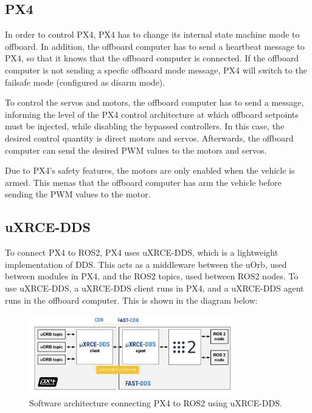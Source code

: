 \documentclass[a4paper]{article}
\begin{document}
\subsection{PX4}

In order to control PX4, PX4 has to change its internal state machine mode to offboard.
In addition, the offboard computer has to send a heartbeat message to PX4, so that it knows that the offboard computer is connected.
If the offboard computer is not sending a specfic offboard mode message, PX4 will switch to the failsafe mode (configured as disarm mode).

To control the servos and motors, the offboard computer has to send a message, informing the level of the PX4 control architecture at which offboard setpoints must be injected, while disabling the bypassed controllers. 
In this case, the desired control quantity is direct motors and servos. 
Afterwards, the offboard computer can send the desired PWM values to the motors and servos.

Due to PX4's safety features, the motors are only enabled when the vehicle is armed. 
This menas that the offboard computer has arm the vehicle before sending the PWM values to the motor. 

\subsection{uXRCE-DDS}

To connect PX4 to ROS2, PX4 uses uXRCE-DDS, which is a lightweight implementation of DDS. 
This acts as a middleware between the uOrb, used between modules in PX4, and the ROS2 topics, used between ROS2 nodes. 
To use uXRCE-DDS, a uXRCE-DDS client runs in PX4, and a uXRCE-DDS agent runs in the offboard computer. 
This is shown in the diagram below: 

\begin{figure}[H]
    \centering
    \includegraphics[width=0.8\textwidth]{imgs/architecture_xrce_dds_ros2.png}
    \caption{Software architecture connecting PX4 to ROS2 using uXRCE-DDS.}
    \label{fig:architecture_xrce_dds_ros2}
\end{figure}
\end{document}
